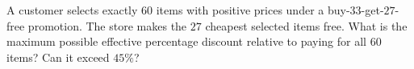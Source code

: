 A customer selects exactly $60$ items with positive prices under a buy-$33$-get-$27$-free promotion. The store makes the $27$ cheapest selected items free. What is the maximum possible effective percentage discount relative to paying for all $60$ items? Can it exceed $45\%$?
